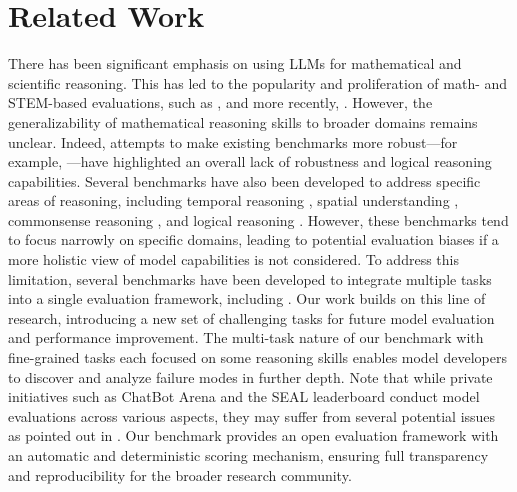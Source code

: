\section{Related Work}
There has been significant emphasis on using LLMs for mathematical and scientific reasoning. This has led to the popularity and proliferation of math- and STEM-based evaluations, such as \citep{hendrycks2020measuring, gsm8k}, and more recently, \citep{glazer2024frontiermathbenchmarkevaluatingadvanced, phan2025humanitysexam}. However, the generalizability of mathematical reasoning skills to broader domains remains unclear. Indeed, attempts to make existing benchmarks more robust—for example, \cite{mirzadeh2024gsm}—have highlighted an overall lack of robustness and logical reasoning capabilities. Several benchmarks have also been developed to address specific areas of reasoning, including temporal reasoning \citep{xiong2024large, beniwal2024remember, dhingra2022time}, spatial understanding \citep{bohnet2024exploringbenchmarkingplanningcapabilities, yamada2023evaluating, mirzaee2021spartqa, shi2022stepgame}, commonsense reasoning \citep{zellers2019hellaswag, talmor2018commonsenseqa, sakaguchi2021winogrande}, and logical reasoning \citep{saparov2022language, tafjord2020proofwriter, saparov2023testing,parmar2024logicbench}. However, these benchmarks tend to focus narrowly on specific domains, leading to potential evaluation biases if a more holistic view of model capabilities is not considered. To address this limitation, several benchmarks have been developed to integrate multiple tasks into a single evaluation framework, including \citep{wang2018glue, wang2019superglue, weston2015towards, lu2023mathvista, kazemi2024remi, hendrycks2020measuring,wang2024mmlu,parmar2024logicbench,srivastava2022beyond}. Our work builds on this line of research, introducing a new set of challenging tasks for future model evaluation and performance improvement. The multi-task nature of our benchmark with fine-grained tasks each focused on some reasoning skills enables model developers to discover and analyze failure modes in further depth.
Note that while private initiatives such as ChatBot Arena \citep{huggingfaceChatbotArena} and the SEAL leaderboard \citep{scaleSEALLeaderboards} conduct model evaluations across various aspects, they may suffer from several potential issues as pointed out in \cite{bansal2024peekingbehindclosed}. Our benchmark provides an open evaluation framework with an automatic and deterministic scoring mechanism, ensuring full transparency and reproducibility for the broader research community.